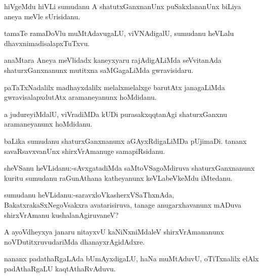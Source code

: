\documentclass{article}
\begin{document}
\begin{mn}%
hiVgeMdu hiVLi sumudanu A shatutxGanxnanUnx puSakxlananUnx biLiya aneya meVle sUrisidanu.
\end{mn}

\begin{mn}%
tamaTe ramaDoVlu muMtAdavugaLU, viVNAdigalU, sumudanu heVLalu dhavxnimadisalapxTuTxvu.
\end{mn}

\begin{mn}%
anaMtara Aneya meVlidadx kaneyxyaru rajAdigALiMda seVvitanAda shaturxGanxnanunx mutitxna 
saMGagaLiMda gwravisidaru.
\end{mn}

\begin{mn}%
paTaTxNadalilx madhayxdalilx melalxmelalxge barutAtx janagaLiMda gwravisalapxdutAtx 
aramaneyanunx hoMdidanu.
\end{mn}

\begin{mn}%
a judureyiMdalU, viVradiMDa kUDi purasakxqqtanAgi shaturxGanxnu aramaneyanunx hoMdidanu.
\end{mn}

\begin{mn}%
baLika sumudanu shaturxGanxnanunx aGAyxRdigaLiMDa pUjimaDi. tananx savaRsavxvanUnx 
shirxVrAmanuge samapiRsidanu.
\end{mn}


\begin{mn}%
sheVSanu heVLidanu:-sAvxgatadiMda saMtoVSagoMdiruva shaturxGanxnanunx kuritu sumudanu 
raGunAthana katheyanunx keVLabeVkeMdu iMtedanu.
\end{mn}

\begin{mn}%
sumudanu heVLidanu:-saravxloVkasherxVSaThxnAda, BakatxrakaSxNegoVsakxra avatarisiruva, tanage
anugarxhavanunx mADuva shirxVrAmanu kushalanAgiruvaneV?
\end{mn}

\begin{mn}%
A ayoVdheyxya janaru nitayxvU kaNiNxniMdaleV shirxVrAmananunx noVDutitxruvudariMda 
dhanayxrAgidAdxre.
\end{mn}

\begin{mn}%
nananx padathaRgaLAda bUmAyxdigaLU, haNa muMtAduvU, oTiTxnalilx elAlx padAthaRgaLU 
kaqtAthaRvAduvu.
\end{mn}
\end{document}
